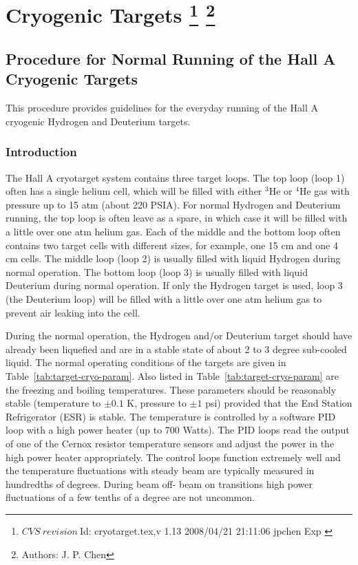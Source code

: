 \chapter[Cryogenic Targets]{Cryogenic Targets
\footnote{
  $CVS~revision~ $Id: cryotarget.tex,v 1.13 2008/04/21 21:11:06 jpchen Exp $ $ }
\footnote{Authors: J. P. Chen }
}

\section{Procedure for Normal Running of the Hall A Cryogenic Targets}
This procedure provides guidelines for the everyday running of the Hall A
cryogenic Hydrogen and Deuterium targets.

\subsection{Introduction }
The Hall A cryotarget system contains three target loops. The top loop (loop 1)
often has a single helium cell, which will be filled with 
either 
$^3$He or $^4$He gas with pressure up to 15 atm (about 220 PSIA). For 
normal Hydrogen and Deuterium running, the top loop is often leave as a spare,
in which 
case it will be filled with a little over one atm helium gas. Each of the 
middle and the bottom loop often contains two target cells with different 
sizes, for example, one 15 cm and one 4 cm cells.
The middle loop (loop 2) is usually filled with liquid Hydrogen during normal 
operation.
The bottom loop (loop 3) is usually filled with liquid Deuterium during normal
operation. If only the Hydrogen target is used, loop 3 (the Deuterium loop) 
will be filled with a little over one atm helium gas to prevent
air leaking into the cell.

\par
During the normal operation, the Hydrogen and/or Deuterium target should
have already been liquefied and are in a stable state of 
about 2 to 3 degree sub-cooled liquid. 
The normal operating conditions of the targets are given in Table~\ref{tab:target-cryo-param}.
Also listed in Table~\ref{tab:target-cryo-param} are the freezing and boiling temperatures.
These parameters should be reasonably stable (temperature to $\pm 0.1$ K, 
pressure to $\pm 1$ psi) provided that the End Station
Refrigerator (ESR) is stable. The
temperature is controlled by a software PID loop with a high power heater (up
to 700 Watts). The PID loops read the output of one
of the Cernox resistor temperature sensors and adjust the power in the high 
power heater appropriately. 
The control loops function extremely well and the temperature fluctuations with
steady beam are typically measured in hundredths of degrees. During beam off-
beam on transitions high power fluctuations of a few tenths of a degree are
not uncommon.

